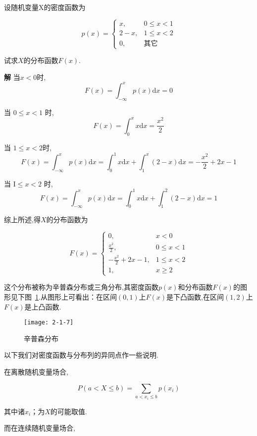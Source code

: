 \begin{example}
	设随机变量X的密度函数为
	
	\[ 
	p(x)=\left\{\begin{array}{ll}{x,} & {0 \leqslant x<1} \\ {2-x,} & {1 \leqslant x<2} \\ {0,} & {\text{其它}}\end{array}\right.
	\]
	
	试求$ X $的分布函数$ F(x) $.
	
	\textbf{解} 当$ x<0 $时,
	\[ 
	F(x)=\int_{-\infty}^{x} p(x) \mathrm{d} x=0
	\]
	
	当 $0 \leqslant x<1$ 时,
	\[ 
	F(x)=\int_{0}^{x} x \mathrm{d} x=\frac{x^{2}}{2}
	\]
	
	当 $1 \leqslant x<2$时,
	\[ 
	F(x)=\int_{-\infty}^{x} p(x) \mathrm{d} x=\int_{0}^{1} x \mathrm{d} x+\int_{1}^{x}(2-x) \mathrm{d} x=-\frac{x^{2}}{2}+2 x-1
	\]
	
	当 $\mathrm{I} \leqslant x<2$ 时,
	\[ 
	F(x)=\int_{-\infty}^{x} p(x) \mathrm{d} x=\int_{0}^{1} x \mathrm{d} x+\int_{1}^{2}(2-x) \mathrm{d} x=1
	\]
	
	综上所述,得$ X $的分布函数为
	
	\[ 
	F(x)=\left\{\begin{array}{ll}
	{0,} & {x<0} \\ 
	{\frac{x^{2}}{2},} & {0 \leqslant x<1} \\ 
	{-\frac{x^{2}}{2}+2 x-1,} & {1 \leqslant x<2} \\ 
	{1,} & {x \geqslant 2}
	\end{array}\right.
	\]
\end{example}

这个分布被称为辛普森分布或三角分布,其密度函数$ p(x) $和分布函数$ F(x) $的图形见下图~\ref{fig:2-1-7}.从图形上可看出：在区间$ (0,1) $上$ F(x) $是下凸函数,在区间$ (1,2) $上$ F(x) $是上凸函数.

\begin{figure}
	\centering
	\texttt{[image: 2-1-7]}
	\caption{辛普森分布}
	\label{fig:2-1-7}
\end{figure}

以下我们对密度函数与分布列的异同点作一些说明.

在离散随机变量场合,

\[ 
P(a<X \leqslant b)=\sum_{a<x_{i} \leqslant b} p\left(x_{i}\right)
\]

其中诸$ x_i $；为$ X $的可能取值.

而在连续随机变量场合,

